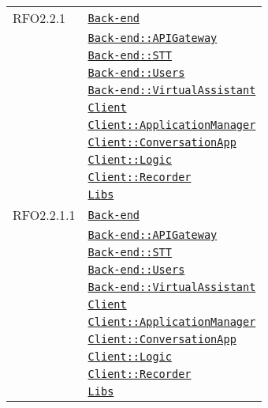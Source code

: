 \begin{longtable}{|>{\centering}m{3cm}|m{10cm}<{\centering}|}
RFO2.2.1 & \hyperref[Back-end]{\texttt{Back-end}}\\
& \hyperref[Back-end::APIGateway]{\texttt{Back-end::APIGateway}}\\
& \hyperref[Back-end::STT]{\texttt{Back-end::STT}}\\
& \hyperref[Back-end::Users]{\texttt{Back-end::Users}}\\
& \hyperref[Back-end::VirtualAssistant]{\texttt{Back-end::VirtualAssistant}}\\
& \hyperref[Client]{\texttt{Client}}\\
& \hyperref[Client::ApplicationManager]{\texttt{Client::ApplicationManager}}\\
& \hyperref[Client::ConversationApp]{\texttt{Client::ConversationApp}}\\
& \hyperref[Client::Logic]{\texttt{Client::Logic}}\\
& \hyperref[Client::Recorder]{\texttt{Client::Recorder}}\\
& \hyperref[Libs]{\texttt{Libs}}\\ \hline

RFO2.2.1.1 & \hyperref[Back-end]{\texttt{Back-end}}\\
& \hyperref[Back-end::APIGateway]{\texttt{Back-end::APIGateway}}\\
& \hyperref[Back-end::STT]{\texttt{Back-end::STT}}\\
& \hyperref[Back-end::Users]{\texttt{Back-end::Users}}\\
& \hyperref[Back-end::VirtualAssistant]{\texttt{Back-end::VirtualAssistant}}\\
& \hyperref[Client]{\texttt{Client}}\\
& \hyperref[Client::ApplicationManager]{\texttt{Client::ApplicationManager}}\\
& \hyperref[Client::ConversationApp]{\texttt{Client::ConversationApp}}\\
& \hyperref[Client::Logic]{\texttt{Client::Logic}}\\
& \hyperref[Client::Recorder]{\texttt{Client::Recorder}}\\
& \hyperref[Libs]{\texttt{Libs}}\\ \hline


\end{longtable}
